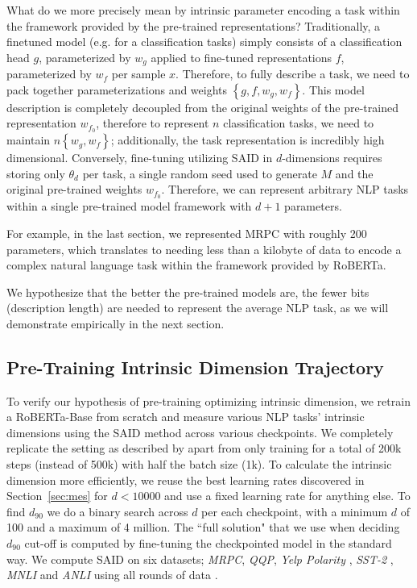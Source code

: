\documentclass{article} \usepackage{iclr2020_conference,times}
\begin{document}
What do we more precisely mean by intrinsic parameter encoding a task within the framework provided by the pre-trained representations? Traditionally, a finetuned model (e.g. for a classification tasks) simply consists of a classification head $g$, parameterized by $w_g$ applied to fine-tuned representations $f$, parameterized by $w_f$ per sample $x$. Therefore, to fully describe a task, we need to pack together parameterizations and weights $\left\{g,f, w_g, w_f\right\}$. This model description is completely decoupled from the original weights of the pre-trained representation $w_{f_0}$, therefore to represent $n$ classification tasks, we need to maintain $n \left\{w_g, w_f\right\}$; additionally, the task representation is incredibly high dimensional. Conversely, fine-tuning utilizing SAID in $d$-dimensions requires storing only $\theta_d$ per task, a single random seed used to generate $M$ and the original pre-trained weights $w_{f_0}$. Therefore, we can represent arbitrary NLP tasks within a single pre-trained model framework with $d+1$ parameters.

For example, in the last section, we represented MRPC with roughly 200 parameters, which translates to needing less than a kilobyte of data to encode a complex natural language task within the framework provided by RoBERTa.

We hypothesize that the better the pre-trained models are, the fewer bits (description length) are needed to represent the average NLP task, as we will demonstrate empirically in the next section.

\subsection{Pre-Training Intrinsic Dimension Trajectory}
\label{sec:trajectory}
To verify our hypothesis of pre-training optimizing intrinsic dimension, we retrain a RoBERTa-Base from scratch and measure various NLP tasks' intrinsic dimensions using the SAID method across various checkpoints. We completely replicate the setting as described by \citep{ROBERTA} apart from only training for a total of 200k steps (instead of 500k) with half the batch size (1k). To calculate the intrinsic dimension more efficiently, we reuse the best learning rates discovered in Section~\ref{sec:mes} for $d < 10000$ and use a fixed learning rate for anything else. To find $d_{90}$ we do a binary search across $d$ per each checkpoint, with a minimum $d$ of 100 and a maximum of 4 million. The ``full solution" that we use when deciding $d_{90}$ cut-off is computed by fine-tuning the checkpointed model in the standard way. We compute SAID on six datasets; \textit{MRPC}, \textit{QQP}, \textit{Yelp Polarity} \citep{yelp_polarity}, \textit{SST-2} \citep{sst2}, \textit{MNLI} \citep{mnli} and \textit{ANLI} using all rounds of data \citep{anli}.
\end{document}
